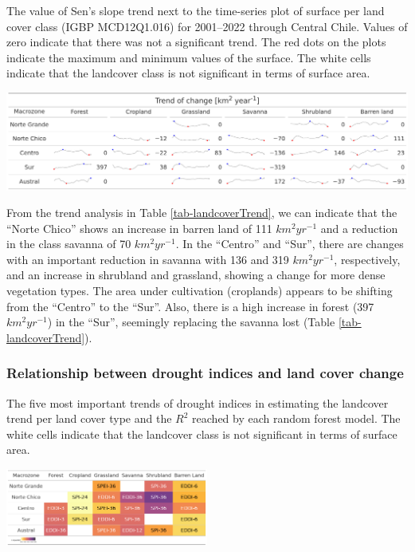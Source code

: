 \documentclass[
  authoryear,
  preprint,
  3p,
  onecolumn]{elsarticle}
\begin{document}
\begin{table}[!ht]
\caption{The value of Sen's slope trend next to the time-series plot of surface per land cover class (IGBP MCD12Q1.016) for 2001–2022 through Central Chile. Values of zero indicate that there was not a significant trend. The red dots on the plots indicate the maximum and minimum values of the surface. The white cells indicate that the landcover class is not significant in terms of surface area.}
\label{tab-landcoverTrend}
\includegraphics[]{../output/figs/table_var_landcover_macro.png}
\end{table}

From the trend analysis in Table \ref{tab-landcoverTrend}, we can
indicate that the ``Norte Chico'' shows an increase in barren land of
111 \(km^2 yr^{-1}\) and a reduction in the class savanna of 70
\(km^2 yr^{-1}\). In the ``Centro'' and ``Sur'', there are changes with
an important reduction in savanna with 136 and 319 \(km^2 yr^{-1}\),
respectively, and an increase in shrubland and grassland, showing a
change for more dense vegetation types. The area under cultivation
(croplands) appears to be shifting from the ``Centro'' to the ``Sur''.
Also, there is a high increase in forest (397 \(km^2 yr^{-1}\)) in the
``Sur'', seemingly replacing the savanna lost (Table
\ref{tab-landcoverTrend}).

\subsubsection{Relationship between drought indices and land cover
change}\label{relationship-between-drought-indices-and-land-cover-change}

\begin{table}[!ht]
\caption{The five most important trends of drought indices in estimating the landcover trend per land cover type and the $R^2$ reached by each random forest model. The white cells indicate that the landcover class is not significant in terms of surface area.}
\label{tab-landcoverTrendRF}
\includegraphics[width=0.5\textwidth]{../output/figs/table_r2_most_important_variables.png}
\end{table}
\end{document}
